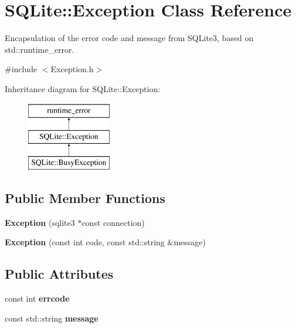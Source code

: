 \hypertarget{class_s_q_lite_1_1_exception}{\section{S\-Q\-Lite\-:\-:Exception Class Reference}
\label{class_s_q_lite_1_1_exception}
}


Encapsulation of the error code and message from S\-Q\-Lite3, based on std\-::runtime\-\_\-error.  




{\ttfamily \#include $<$Exception.\-h$>$}

Inheritance diagram for S\-Q\-Lite\-:\-:Exception\-:\begin{figure}[H]
\begin{center}
\leavevmode
\includegraphics[height=3.000000cm]{class_s_q_lite_1_1_exception}
\end{center}
\end{figure}
\subsection*{Public Member Functions}
\begin{DoxyCompactItemize}
\item 
\hypertarget{class_s_q_lite_1_1_exception_a55056f0e661e2d0c09160404a7260d13}{{\bfseries Exception} (sqlite3 $\ast$const connection)}\label{class_s_q_lite_1_1_exception_a55056f0e661e2d0c09160404a7260d13}

\item 
\hypertarget{class_s_q_lite_1_1_exception_a7b00f63c9d211ea199ad06f184185a07}{{\bfseries Exception} (const int code, const std\-::string \&message)}\label{class_s_q_lite_1_1_exception_a7b00f63c9d211ea199ad06f184185a07}

\end{DoxyCompactItemize}
\subsection*{Public Attributes}
\begin{DoxyCompactItemize}
\item 
\hypertarget{class_s_q_lite_1_1_exception_aba01c386c828c7bd856c1691168aae2e}{const int {\bfseries errcode}}\label{class_s_q_lite_1_1_exception_aba01c386c828c7bd856c1691168aae2e}

\item 
\hypertarget{class_s_q_lite_1_1_exception_a4143712e07629a2d5097039e55189486}{const std\-::string {\bfseries message}}\label{class_s_q_lite_1_1_exception_a4143712e07629a2d5097039e55189486}

\end{DoxyCompactItemize}


